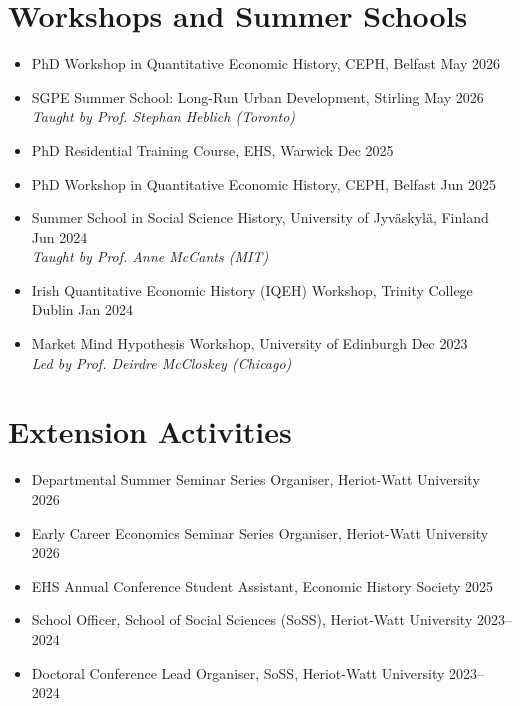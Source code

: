 \documentclass[11pt,a4paper]{article}
\begin{document}
\section{Workshops and Summer Schools}
\begin{itemize}
    \item [] PhD Workshop in Quantitative Economic History, CEPH, Belfast \hfill May 2026 
    \item [] SGPE Summer School: Long-Run Urban Development, Stirling \hfill May 2026 \\
\textit{Taught by Prof. Stephan Heblich (Toronto)}
    \item [] PhD Residential Training Course, EHS, Warwick \hfill Dec 2025 
    \item [] PhD Workshop in Quantitative Economic History, CEPH, Belfast \hfill Jun 2025
    \item [] Summer School in Social Science History, University of Jyv\"{a}skyl\"{a}, Finland \hfill Jun 2024 \\
\textit{Taught by Prof. Anne McCants (MIT)}
    \item []  Irish Quantitative Economic History (IQEH) Workshop, Trinity College Dublin \hfill Jan 2024 
    \item [] Market Mind Hypothesis Workshop, University of Edinburgh \hfill Dec 2023 \\
\textit{Led by Prof. Deirdre McCloskey (Chicago)}
\end{itemize}
 
\section{Extension Activities}
\begin{itemize}
    \item [] Departmental Summer Seminar Series Organiser, Heriot-Watt University \hfill 2026
    \item [] Early Career Economics Seminar Series Organiser, Heriot-Watt University \hfill 2026
    \item [] EHS Annual Conference Student Assistant, Economic History Society \hfill 2025
    \item [] School Officer, School of Social Sciences (SoSS), Heriot-Watt University \hfill 2023--2024
    \item [] Doctoral Conference Lead Organiser, SoSS, Heriot-Watt University \hfill 2023--2024
\end{itemize}
\end{document}
